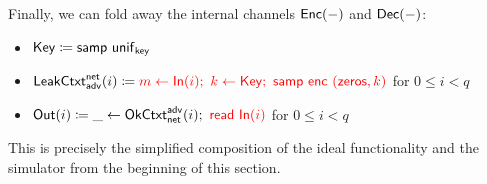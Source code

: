 \noindent Finally, we can fold away the internal channels $\mathsf{Enc}(-)$ and $\mathsf{Dec}(-)$:

\begin{itemize}
\item $\mathsf{Key} \coloneqq \mathsf{samp} \ \mathsf{unif}_{\mathsf{key}}$
\item $\LeakCtxt^\net_\adv(i) \coloneqq {\color{red} m \leftarrow \In(i); \ k \leftarrow \Key; \ \samp{\enc \ (\zeros,k)}}$ for $0 \leq i < q$
\item $\mathsf{Out}(i) \coloneqq \_ \leftarrow \mathsf{OkCtxt}^{\mathsf{adv}}_{\mathsf{net}}(i); \ {\color{red} \mathsf{read} \ \mathsf{In}(i)}$ for $0 \leq i < q$
\end{itemize}

\noindent This is precisely the simplified composition of the ideal functionality and the simulator from the beginning of this section.